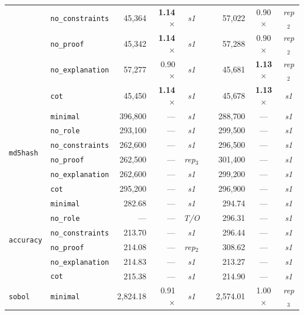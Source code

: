 \begin{table}[t]
{\begin{tabular}{@{}llrrcrrcc@{}}
  & \texttt{no\_constraints} & 45{,}364 & \textbf{1.14}$\times$ & \textit{s1} && 57{,}022 & 0.90$\times$          & \textit{rep}$_2$ \\
  & \texttt{no\_proof}       & 45{,}342 & \textbf{1.14}$\times$ & \textit{s1} && 57{,}288 & 0.90$\times$          & \textit{rep}$_2$ \\
  & \texttt{no\_explanation} & 57{,}277 & 0.90$\times$          & \textit{s1} && 45{,}681 & \textbf{1.13}$\times$ & \textit{rep}$_2$ \\
  & \texttt{cot}             & 45{,}450 & \textbf{1.14}$\times$ & \textit{s1} && 45{,}678 & \textbf{1.13}$\times$ & \textit{s1}      \\
\midrule
\multirow{6}{*}{\texttt{md5hash}}
  & \texttt{minimal}         & 396{,}800 & --- & \textit{s1}      && 288{,}700 & --- & \textit{s1}      \\
  & \texttt{no\_role}        & 293{,}100 & --- & \textit{s1}      && 299{,}500 & --- & \textit{s1}      \\
  & \texttt{no\_constraints} & 262{,}600 & --- & \textit{s1}      && 296{,}500 & --- & \textit{s1}      \\
  & \texttt{no\_proof}       & 262{,}500 & --- & \textit{rep}$_3$ && 301{,}400 & --- & \textit{s1}      \\
  & \texttt{no\_explanation} & 262{,}600 & --- & \textit{s1}      && 299{,}200 & --- & \textit{s1}      \\
  & \texttt{cot}             & 295{,}200 & --- & \textit{s1}      && 296{,}900 & --- & \textit{s1}      \\
\midrule
\multirow{6}{*}{\texttt{accuracy}}
  & \texttt{minimal}         & 282.68 & --- & \textit{s1}       && 294.74 & --- & \textit{s1}      \\
  & \texttt{no\_role}        &    --- & --- & \textit{T/O}      && 296.31 & --- & \textit{s1}      \\
  & \texttt{no\_constraints} & 213.70 & --- & \textit{s1}       && 296.44 & --- & \textit{s1}      \\
  & \texttt{no\_proof}       & 214.08 & --- & \textit{rep}$_2$  && 308.62 & --- & \textit{s1}      \\
  & \texttt{no\_explanation} & 214.83 & --- & \textit{s1}       && 213.27 & --- & \textit{s1}      \\
  & \texttt{cot}             & 215.38 & --- & \textit{s1}       && 214.90 & --- & \textit{s1}      \\
\midrule
\multirow{6}{*}{\texttt{sobol}}
  & \texttt{minimal}         & 2{,}824.18 & 0.91$\times$          & \textit{s1}      && 2{,}574.01   & 1.00$\times$ & \textit{rep}$_3$ \\

\end{tabular}}
\end{table}
